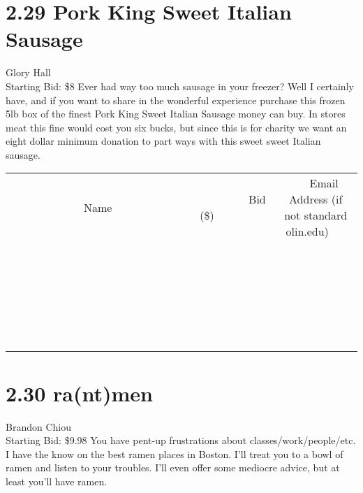 \documentclass[11pt]{article}
\begin{document}
\section*{2.29 Pork King Sweet Italian Sausage}
Glory Hall
\\
Starting Bid: \$8
\newline
Ever had way too much sausage in your freezer? Well I certainly have, and if you want to share in the wonderful experience purchase this frozen 5lb box of the finest Pork King Sweet Italian Sausage money can buy. In stores meat this fine would cost you six bucks, but since this is for charity we want an eight dollar minimum donation to part ways with this sweet sweet Italian sausage.
\\[6ex]
\begin{tabular}{c c c}
~~~~~~~~~~~~~Name~~~~~~~~~~~~~ & ~~~~~~~~~Bid (\$)~~~~~~~~~  & ~~~Email Address (if not standard olin.edu)~~~\\
 & & \\
\hline
 & & \\
\hline
 & & \\
\hline
 & & \\
\hline
 & & \\
\hline
 & & \\
\hline
 & & \\
\hline
 & & \\
\hline
 & & \\
\hline
 & & \\
\hline
 & & \\
\hline
 & & \\
\hline
 & & \\
\hline
 & & \\
\hline
 & & \\
\hline
 & & \\
\hline
 & & \\
\hline
 & & \\
\hline
 & & \\
\hline
 & & \\
\hline
 & & \\
\hline
 & & \\
\hline
 & & \\
\hline
 & & \\
\hline
 & & \\
\hline
 & & \\
\hline
\end{tabular}
\newpage
\section*{2.30 ra(nt)men}
Brandon Chiou
\\
Starting Bid: \$9.98
\newline
You have pent-up frustrations about classes/work/people/etc. I have the know on the best ramen places in Boston. I'll treat you to a bowl of ramen and listen to your troubles. I'll even offer some mediocre advice, but at least you'll have ramen.
\end{document}
